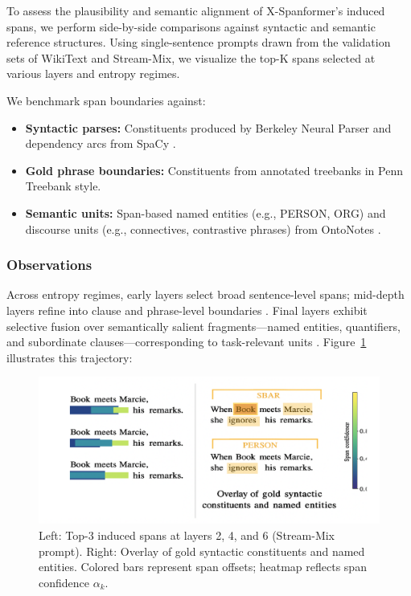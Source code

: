 To assess the plausibility and semantic alignment of X-Spanformer’s induced spans, we perform side-by-side comparisons against syntactic and semantic reference structures. Using single-sentence prompts drawn from the validation sets of WikiText and Stream-Mix, we visualize the top-K spans selected at various layers and entropy regimes.

We benchmark span boundaries against:

\begin{itemize}[leftmargin=1.5em]
  \item \textbf{Syntactic parses:} Constituents produced by Berkeley Neural Parser \cite{kitaev2018constituency} and dependency arcs from SpaCy \cite{honnibal2017spacy}.
  \item \textbf{Gold phrase boundaries:} Constituents from annotated treebanks in Penn Treebank style.
  \item \textbf{Semantic units:} Span-based named entities (e.g., PERSON, ORG) and discourse units (e.g., connectives, contrastive phrases) from OntoNotes \cite{weischedel2013ontonotes}.
\end{itemize}

\subsubsection*{Observations}

Across entropy regimes, early layers select broad sentence-level spans; mid-depth layers refine into clause and phrase-level boundaries \cite{kitaev2018constituency}. Final layers exhibit selective fusion over semantically salient fragments—named entities, quantifiers, and subordinate clauses—corresponding to task-relevant units \cite{weischedel2013ontonotes, honnibal2017spacy}. Figure~\ref{fig:span_alignment_viz} illustrates this trajectory:

\begin{figure}[H]
  \centering
  \includegraphics[width=\textwidth]{figures/figure_8.png}
  \caption{Left: Top-3 induced spans at layers 2, 4, and 6 (Stream-Mix prompt). Right: Overlay of gold syntactic constituents and named entities. Colored bars represent span offsets; heatmap reflects span confidence \(\alpha_k\).}
  \label{fig:span_alignment_viz}
\end{figure}

